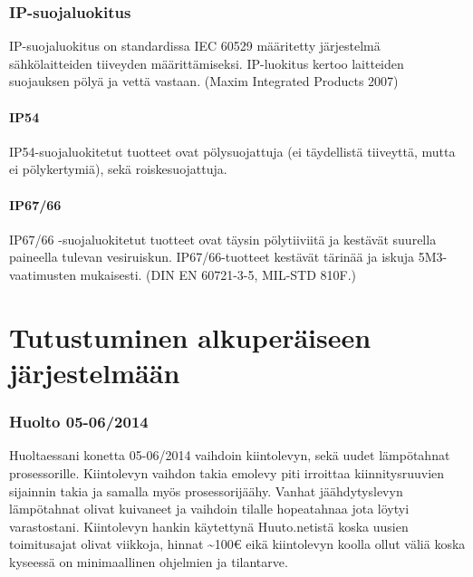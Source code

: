 \documentclass[]{article}
\newcommand{\euro}{€}
\begin{document}
\subsection{IP-suojaluokitus}\label{ip-suojaluokitus}

IP-suojaluokitus on standardissa IEC 60529 määritetty järjestelmä
sähkölaitteiden tiiveyden määrittämiseksi. IP-luokitus kertoo laitteiden
suojauksen pölyä ja vettä vastaan. (Maxim Integrated Products 2007)

\subsubsection{IP54}\label{ip54}

IP54-suojaluokitetut tuotteet ovat pölysuojattuja (ei täydellistä
tiiveyttä, mutta ei pölykertymiä), sekä roiskesuojattuja.

\subsubsection{IP67/66}\label{ip6766}

IP67/66 -suojaluokitetut tuotteet ovat täysin pölytiiviitä ja kestävät
suurella paineella tulevan vesiruiskun. IP67/66-tuotteet kestävät
tärinää ja iskuja 5M3-vaatimusten mukaisesti. (DIN EN 60721-3-5, MIL-STD
810F.)

\chapter{Tutustuminen alkuperäiseen
järjestelmään}\label{tutustuminen-alkuperuxe4iseen-juxe4rjestelmuxe4uxe4n}

\subsection{Huolto 05-06/2014}\label{huolto-05-062014}

Huoltaessani konetta 05-06/2014 vaihdoin kiintolevyn, sekä uudet
lämpötahnat prosessorille. Kiintolevyn vaihdon takia emolevy piti
irroittaa kiinnitysruuvien sijainnin takia ja samalla myös
prosessorijäähy. Vanhat jäähdytyslevyn lämpötahnat olivat kuivaneet ja
vaihdoin tilalle hopeatahnaa jota löytyi varastostani. Kiintolevyn
hankin käytettynä Huuto.netistä koska uusien toimitusajat olivat
viikkoja, hinnat \textasciitilde{}100\euro{} eikä kiintolevyn koolla
ollut väliä koska kyseessä on minimaallinen ohjelmien ja tilantarve.
\end{document}
